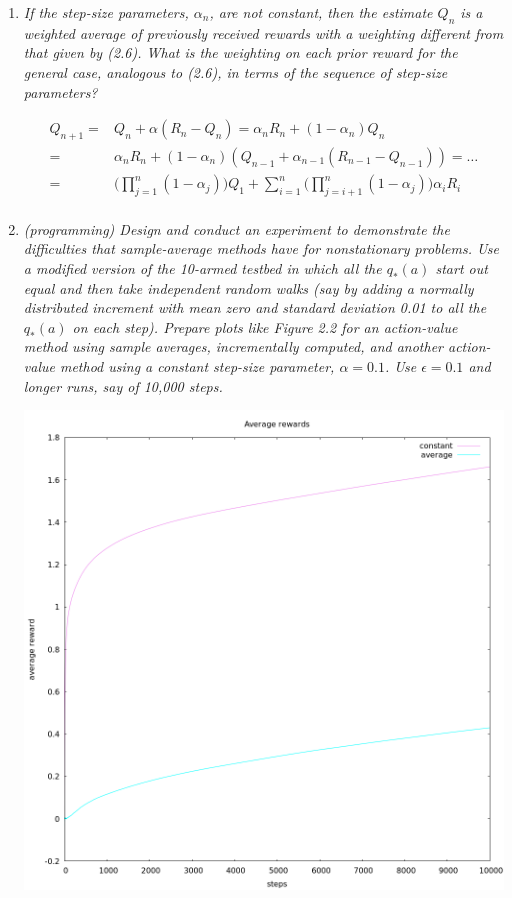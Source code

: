 \documentclass[12pt,a4paper]{article}
\begin{document}
\begin{enumerate}
\item
  \textit{If the step-size parameters, $\alpha_n$, are not constant, then the estimate $Q_n$ is
  a weighted average of previously received rewards with a weighting different from that
  given by (2.6). What is the weighting on each prior reward for the general case, analogous
  to (2.6), in terms of the sequence of step-size parameters?}

  \begin{align*}
  Q_{n + 1} = & Q_n + \alpha(R_n - Q_n) = \alpha_n R_n + (1 - \alpha_n)Q_n \\
  = & \alpha_n R_n + (1 - \alpha_n)(Q_{n - 1} + \alpha_{n - 1}(R_{n - 1} - Q_{n - 1})) = \dots \\
  = & \Big(\prod\limits_{j = 1}^n (1 - \alpha_j)\Big) Q_1 +
  \sum\limits_{i = 1}^n \Big(\prod\limits_{j = i + 1}^n (1 - \alpha_j) \Big)\alpha_i R_i \\
  \end{align*}

\item
  \textit{(programming) Design and conduct an experiment to demonstrate the
  difficulties that sample-average methods have for nonstationary problems. Use a modified
  version of the 10-armed testbed in which all the $q_*(a)$ start out equal and then take
  independent random walks (say by adding a normally distributed increment with mean
  zero and standard deviation 0.01 to all the $q_*(a)$ on each step). Prepare plots like
  Figure 2.2 for an action-value method using sample averages, incrementally computed,
  and another action-value method using a constant step-size parameter, $\alpha = 0.1$. Use
  $\epsilon = 0.1$ and longer runs, say of 10,000 steps.}

  {\centering
  \includegraphics[scale=0.3]{average}

}
\end{enumerate}
\end{document}
